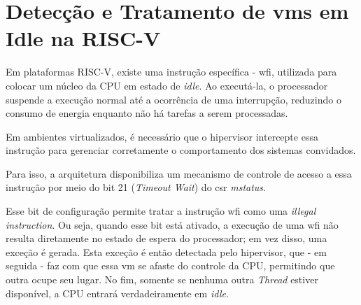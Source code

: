 \section{Detecção e Tratamento de \glspl{vm} em Idle na RISC-V}

Em plataformas RISC-V, existe uma instrução específica - \gls{wfi}, utilizada para colocar um núcleo da CPU em estado de \textit{idle}. Ao executá-la, o processador suspende a execução normal até a
ocorrência de uma interrupção, reduzindo o consumo de energia enquanto não há tarefas a serem processadas.

Em ambientes virtualizados, é necessário que o hipervisor intercepte essa instrução para gerenciar corretamente o comportamento dos sistemas convidados.

Para isso, a arquitetura disponibiliza um mecanismo de controle de acesso a essa instrução por meio do bit 21 (\textit{Timeout Wait}) do \gls{csr} \textit{mstatus}.

Esse bit de configuração permite tratar a instrução \gls{wfi} como uma \textit{illegal instruction}.
Ou seja, quando esse bit está ativado, a execução de uma \gls{wfi} não resulta diretamente
no estado de espera do processador; em vez disso, uma exceção é gerada.
Esta exceção é então detectada pelo hipervisor, que - em seguida - faz com que essa \gls{vm} se afaste do controle da CPU, permitindo que outra ocupe seu lugar. No fim, somente se nenhuma outra
\textit{Thread} estiver disponível, a CPU entrará verdadeiramente em \textit{idle}.
